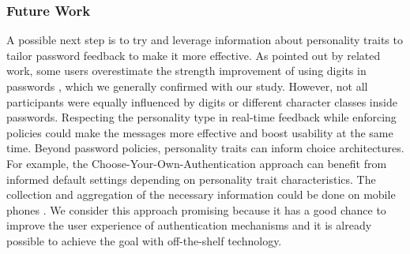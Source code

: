 \subsubsection{Future Work}
A possible next step is to try and leverage information about personality traits to tailor password feedback to make it more effective. As pointed out by related work, some users overestimate the strength improvement of using digits in passwords \cite{Ur2016PerceptionsPassword}, which we generally confirmed with our study. However, not all participants were equally influenced by digits or different character classes inside passwords. Respecting the personality type in real-time feedback while enforcing policies could make the messages more effective and boost usability at the same time. Beyond password policies, personality traits can inform choice architectures. For example, the Choose-Your-Own-Authentication approach \cite{Forget2015CYOA} can benefit from informed default settings depending on personality trait characteristics. The collection and aggregation of the necessary information could be done on mobile phones \cite{DeMontjoye2013}. We consider this approach promising because it has a good chance to improve the user experience of authentication mechanisms and it is already possible to achieve the goal with off-the-shelf technology.



\noindent
{}

